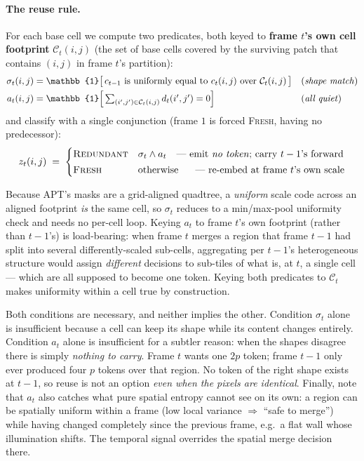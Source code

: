 \paragraph{The reuse rule.}
For each base cell we compute two predicates, both keyed to \textbf{frame $t$'s
own cell footprint} $\mathcal{C}_t(i,j)$ (the set of base cells covered by the
surviving patch that contains $(i,j)$ in frame $t$'s partition):
\begin{align}
  \sigma_t(i,j) &= \mathbb{1}\big[\, c_{t-1} \text{ is uniformly equal to } c_t(i,j) \text{ over } \mathcal{C}_t(i,j) \,\big] && \text{(\emph{shape match})} \\
  a_t(i,j) &= \mathbb{1}\Big[\textstyle\sum_{(i',j') \in \mathcal{C}_t(i,j)} d_t(i',j') = 0\Big] && \text{(\emph{all quiet})}
\end{align}
and classify with a single conjunction (frame $1$ is forced \textsc{Fresh},
having no predecessor):
\begin{equation}
  \label{eq:classify}
  z_t(i,j) \;=\;
  \begin{cases}
    \textsc{Redundant} & \sigma_t \wedge a_t \quad\text{--- emit \emph{no token}; carry $t-1$'s forward} \\[2pt]
    \textsc{Fresh}     & \text{otherwise} \quad\;\;\, \text{--- re-embed at frame $t$'s own scale}
  \end{cases}
\end{equation}

Because APT's masks are a grid-aligned quadtree, a \emph{uniform} scale code
across an aligned footprint \emph{is} the same cell, so $\sigma_t$ reduces to a
min/max-pool uniformity check and needs no per-cell loop. Keying $a_t$ to frame
$t$'s own footprint (rather than $t-1$'s) is load-bearing: when frame $t$ merges a
region that frame $t-1$ had split into several differently-scaled sub-cells,
aggregating per $t-1$'s heterogeneous structure would assign \emph{different}
decisions to sub-tiles of what is, at $t$, a single cell --- which are all
supposed to become one token. Keying both predicates to $\mathcal{C}_t$ makes
uniformity within a cell true by construction.

Both conditions are necessary, and neither implies the other. Condition
$\sigma_t$ alone is insufficient because a cell can keep its shape while its
content changes entirely. Condition $a_t$ alone is insufficient for a subtler
reason: when the shapes disagree there is simply \emph{nothing to carry}. Frame
$t$ wants one $2p$ token; frame $t-1$ only ever produced four $p$ tokens over
that region. No token of the right shape exists at $t-1$, so reuse is not an
option \emph{even when the pixels are identical}. Finally, note that $a_t$ also
catches what pure spatial entropy cannot see on its own: a region can be
spatially uniform within a frame (low local variance $\Rightarrow$ ``safe to
merge'') while having changed completely since the previous frame, e.g.\ a flat
wall whose illumination shifts. The temporal signal overrides the spatial merge
decision there.

